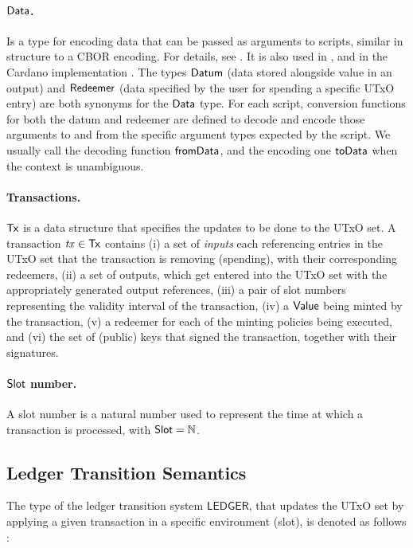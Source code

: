\paragraph{$\textsf{Data}$. } Is a type for encoding data that can be passed as arguments
to scripts, similar in structure to a CBOR encoding.
For details, see \cite{agdaspeceutxo}. It is also used in \cite{eutxoma},
and in the Cardano implementation \cite{cardano}.
The types $\mathsf{Datum}$ (data stored alongside value in an output) and
$\mathsf{Redeemer}$ (data specified by the user for spending a specific UTxO entry)
are both synonyms for the $\textsf{Data}$ type. For each script, conversion functions
for both the datum and redeemer are defined to decode and encode those arguments
to and from the specific argument types expected by the script. We usually call the decoding
function $\mathsf{fromData}$, and the encoding one $\mathsf{toData}$ when the context
is unambiguous.

\paragraph{Transactions. } $\mathsf{Tx}$ is a data structure that specifies
the updates to be done to the UTxO set. A transaction $\mathit{tx} \in \mathsf{Tx}$
contains (i) a set of \emph{inputs} each referencing entries in the UTxO set that the transaction
is removing (spending), with their corresponding redeemers, (ii) a set of outputs, which get entered into the
UTxO set with the appropriately generated output references, (iii) a pair of slot
numbers representing the validity interval of the transaction, (iv) a $\mathsf{Value}$ being
minted by the transaction, (v) a redeemer for each
of the minting policies being executed, and (vi) the set of (public) keys that signed the
transaction, together with their signatures.

\paragraph{$\mathsf{Slot}$ number. }  A slot number is a natural number used to represent
the time at which a transaction is processed, with $\mathsf{Slot} = \mathbb{N}$.

\subsection{Ledger Transition Semantics}
\label{sec:ledgersem}

The type of the ledger transition system $\mathsf{LEDGER}$, that updates the UTxO
set by applying a given transaction in a specific environment (slot), is
denoted as follows :

